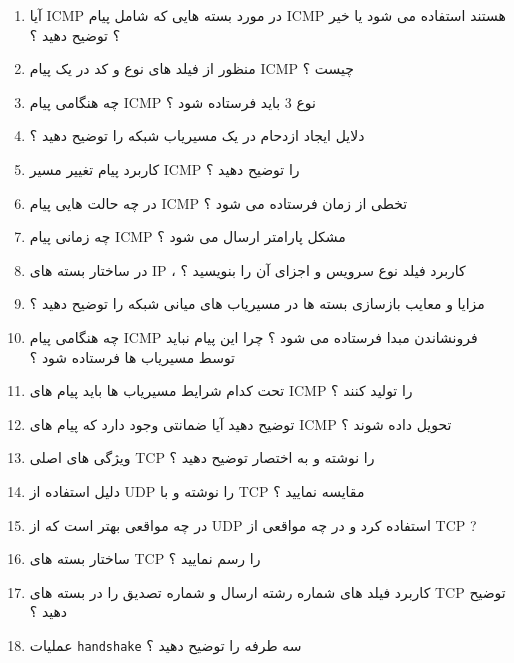 \documentclass{article}
\begin{document}
\begin{enumerate}
\item آیا ICMP در مورد بسته هایی که شامل پیام  ICMP هستند استفاده می شود یا خیر ؟ توضیح دهید ؟

\item منظور از فیلد های نوع و کد در یک پیام ICMP چیست ؟

\item چه هنگامی پیام ICMP نوع 3 باید فرستاده شود ؟

\item دلایل ایجاد ازدحام در یک مسیریاب شبکه را توضیح دهید ؟

\item کاربرد پیام تغییر مسیر ICMP را توضیح دهید ؟

\item در چه حالت هایی پیام ICMP تخطی از زمان فرستاده می شود ؟

\item چه زمانی پیام ICMP مشکل پارامتر ارسال می شود ؟

\item در ساختار بسته های IP ، کاربرد فیلد نوع سرویس و اجزای آن را بنویسید ؟

\item مزایا و معایب بازسازی بسته ها در مسیریاب های میانی شبکه را توضیح دهید ؟

\item چه هنگامی پیام  ICMP فرونشاندن مبدا فرستاده می شود ؟ چرا این پیام نباید توسط مسیریاب ها فرستاده شود ؟

\item تحت کدام شرایط مسیریاب ها باید پیام های ICMP را تولید کنند ؟

\item توضیح دهید آیا ضمانتی وجود دارد که پیام های ICMP تحویل داده شوند ؟

\item ویژگی های اصلی TCP را نوشته و به اختصار توضیح دهید ؟

\item دلیل استفاده از UDP را نوشته و با TCP مقایسه نمایید ؟

\item در چه مواقعی بهتر است که از UDP استفاده کرد و در چه مواقعی از TCP ?

\item ساختار بسته های TCP را رسم نمایید ؟

\item کاربرد فیلد های شماره رشته ارسال و شماره تصدیق را در بسته های TCP توضیح دهید ؟

\item عملیات \lstinline{handshake} سه طرفه را توضیح دهید ؟


\end{enumerate}
\end{document}
